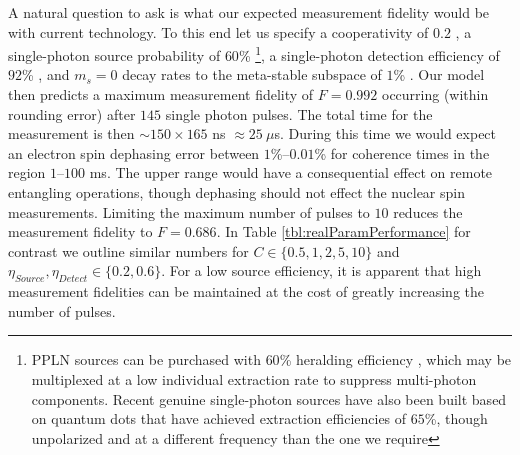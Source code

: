 \documentclass[aps,pra,amsmath,amssymb,reprint,superscriptaddress,tightenlines]{revtex4-1}
\begin{document}
A natural question to ask is what our expected measurement fidelity would be with current technology. To this end let us specify a cooperativity of $0.2$ \cite{Janitz15}, a single-photon source probability of $60$\% \footnote{PPLN sources can be purchased with $60$\% heralding efficiency \cite{Idquantique16}, which may be multiplexed at a low individual extraction rate to suppress multi-photon components. Recent genuine single-photon sources have also been built based on quantum dots \cite{Somaschi16} that have achieved extraction efficiencies of $65$\%, though unpolarized and at a different frequency than the one we require}, a single-photon detection efficiency of $92$\%  \cite{QuantumOpus16,PhotonSpot16,Scontel16,SingleQuantum16,ExcelitasTechnologies16,LaserComponents16}, and $m_{s}=0$ decay rates to the meta-stable subspace of $1$\% \cite{Goldman15}. Our model then predicts a maximum measurement fidelity of $F=0.992$ occurring (within rounding error) after $145$ single photon pulses. The total time for the measurement is then $\sim 150\times165$ ns $\approx 25\:\mu$s. During this time we would expect an electron spin dephasing error between $1$\%--$0.01$\% for coherence times in the region $1$--$100$ ms. The upper range would have a consequential effect on remote entangling operations, though dephasing should not effect the nuclear spin measurements. Limiting the maximum number of pulses to $10$ reduces the measurement fidelity to $F=0.686$. In Table \ref{tbl:realParamPerformance} for contrast we outline similar numbers for $C\in\{0.5,1,2,5,10\}$ and $\eta_{Source},\eta_{Detect}\in\{0.2,0.6\}$. For a low source efficiency, it is apparent that high measurement fidelities can be maintained at the cost of greatly increasing the number of pulses.
\end{document}
